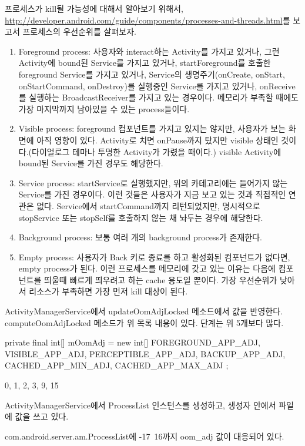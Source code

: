 프로세스가 kill될 가능성에 대해서 알아보기 위해서, 
\url{http://developer.android.com/guide/components/processes-and-threads.html}를 보고서 프로세스의 우선순위를 살펴보자.
\begin{enumerate}
\item Foreground process: 사용자와 interact하는 Activity를 가지고 있거나, 그런 Activity에 bound된 Service를 가지고 있거나, startForeground를 호출한 foreground Service를 가지고 있거나, Service의 생명주기(onCreate, onStart, onStartCommand, onDestroy)를 실행중인 Service를 가지고 있거나, onReceive를 실행하는 BroadcastReceiver를 가지고 있는 경우이다.
메모리가 부족할 때에도 가장 마지막까지 남아있을 수 있는 process들이다.
\item Visible process: foreground 컴포넌트를 가지고 있지는 않지만, 사용자가 보는 화면에 아직 영향이 있다. Activity로 치면 onPause까지 탔지만 visible 상태인 것이다.(다이얼로그 테마나 투명한 Activity가 가렸을 때이다.)
visible Activity에 bound된 Service를 가진 경우도 해당한다. 
\item Service process: startService로 실행했지만, 위의 카테고리에는 들어가지 않는 Service를 가진 경우이다. 이런 것들은 사용자가 지금 보고 있는 것과 직접적인 연관은 없다. Service에서 startCommand까지 리턴되었지만, 명시적으로 stopService 또는 stopSelf를 호출하지 않는 채 놔두는 경우에 해당한다.
\item Background process: 보통 여러 개의 background process가 존재한다.
\item Empty process: 사용자가 Back 키로 종료를 하고 활성화된 컴포넌트가 없다면,  empty process가 된다. 이런 프로세스를 메모리에 갖고 있는 이유는 다음에 컴포넌트를 띄울때 빠르게 띄우려고 하는 cache 용도일 뿐이다. 가장 우선순위가 낮아서 리소스가 부족하면 가장 먼저 kill 대상이 된다.
\end{enumerate}

ActivityManagerService에서 updateOomAdjLocked 메소드에서 값을 반영한다.
computeOomAdjLocked 메소드가 위 목록 내용이 있다.
단계는 위 5개보다 많다.

    private final int[] mOomAdj = new int[] {
            FOREGROUND_APP_ADJ, VISIBLE_APP_ADJ, PERCEPTIBLE_APP_ADJ,
            BACKUP_APP_ADJ, CACHED_APP_MIN_ADJ, CACHED_APP_MAX_ADJ
    };
    
    0, 1, 2, 3, 9, 15

ActivityManagerService에서 ProcessList 인스턴스를 생성하고, 생성자 안에서 파일에 값을 쓰고 있다.

com.android.server.am.ProcessList에 -17~16까지 oom_adj 값이 대응되어 있다.

